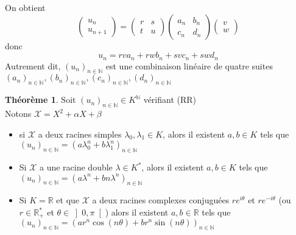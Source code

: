 \documentclass[10pt,a4paper]{article}
\theoremstyle{definition}
\newtheorem{theorem}[proposition]{Théorème}
\begin{document}
On obtient
\[ \begin{pmatrix}
u_n \\
u_{n + 1}
\end{pmatrix} = \begin{pmatrix}
r & s \\
t & u
\end{pmatrix} \begin{pmatrix}
a_n & b_n \\
c_n & d_n
\end{pmatrix} \begin{pmatrix}
v \\
w
\end{pmatrix} \]
donc
\[u_n = rv a_n + rw b_n + sv c_n + sw d_n\]
Autrement dit, $(u_n)_{n \in \mathbb{N}}$ est une combinaison linéaire de quatre suites $(a_n)_{n \in \mathbb{N}}, (b_n)_{n \in \mathbb{N}}, (c_n)_{n \in \mathbb{N}}, (d_n)_{n \in \mathbb{N}}$
\begin{theorem}
Soit $(u_n)_{n \in \mathbb{N}} \in K^\mathbb{N}$ vérifiant (RR) \\
Notons $\mathcal{X} = X^2 + \alpha X + \beta$
\begin{itemize}
\item si $\mathcal{X}$ a deux racines simples $\lambda_0, \lambda_1 \in K$, alors il existent $a, b \in K$ tels que  $(u_n)_{n \in \mathbb{N}} = (a \lambda_0^n + b \lambda_1^n)_{n \in \mathbb{N}}$
\item Si $\mathcal{X}$ a une racine double $\lambda \in K^*$, alors il existent $a, b \in K$ tels que $(u_n)_{n \in \mathbb{N}} = (a \lambda^n + b n \lambda^n)_{n \in \mathbb{N}}$
\item Si $K = \mathbb{R}$ et que $\mathcal{X}$ a deux racines complexes conjuguées $re^{i\theta}$ et $re^{-i\theta}$ (ou $r \in \mathbb{R}_+^*$ et $\theta \in \left] 0, \pi \right[$) alors il existent $a, b \in \mathbb{R}$ tels que $(u_n)_{n \in \mathbb{N}} = \left(ar^n \cos(n\theta) + br^n \sin(n\theta)\right)_{n \in \mathbb{N}}$
\end{itemize}
\end{theorem}
\end{document}
